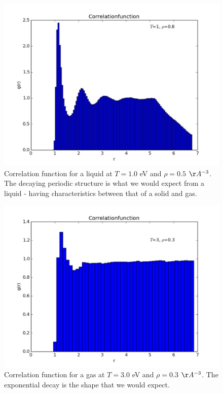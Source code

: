 \documentclass{article}
\begin{document}
\begin{multicols}{2}
\begin{figure}[H]
\begin{center}
\includegraphics[width=\linewidth]{plots/corfunct1rho08n864lp500.pdf}
\caption{Correlation function for a liquid at $T=1.0$ eV and $\rho=0.5$ $\AA ^{-3}$.  The decaying periodic structure is what we would expect from a liquid - having characteristics between that of a solid and gas.}
\label{corliquid}
\end{center}
\end{figure}

\begin{figure}[H]
\begin{center}
\includegraphics[width=\linewidth]{plots/correlationfunctionT3Rho03x.pdf}
\caption{Correlation function for a gas at $T=3.0$ eV and $\rho = 0.3$ $\AA ^{-3}$.  The exponential decay is the shape that we would expect.}
\label{corgas}
\end{center}
\end{figure}


\end{multicols}
\end{document}
